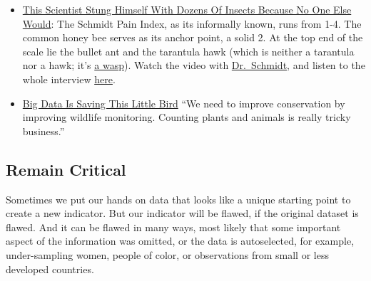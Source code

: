 \documentclass[
  a4paper,
  openany, a4paper, oneside]{book}
\providecommand{\tightlist}{%
  \setlength{\itemsep}{0pt}\setlength{\parskip}{0pt}}
\begin{document}
\begin{itemize}
\tightlist
\item
  \href{https://fivethirtyeight.com/features/this-scientist-stung-himself-with-dozens-of-insects-because-no-one-else-would/}{This Scientist Stung Himself With Dozens Of Insects Because No One Else Would}: The Schmidt Pain Index, as its informally known, runs from 1-4. The common honey bee serves as its anchor point, a solid 2. At the top end of the scale lie the bullet ant and the tarantula hawk (which is neither a tarantula nor a hawk; it's \href{https://www.wired.com/2015/07/absurd-creature-of-the-week-tarantula-hawk/}{a wasp}). Watch the video with \href{https://youtu.be/i0LjT-qkUes}{Dr.~Schmidt}, and listen to the whole interview \href{https://podcasts.apple.com/us/podcast/48-the-schmidt-sting-pain-index/id1011406983?i=1000391467968}{here}.
\item
  \href{https://fivethirtyeight.com/features/big-data-is-saving-this-little-bird/}{Big Data Is Saving This Little Bird} ``We need to improve conservation by improving wildlife monitoring. Counting plants and animals is really tricky business.''
\end{itemize}

\hypertarget{critical-attitude}{%
\subsection{Remain Critical}\label{critical-attitude}}

Sometimes we put our hands on data that looks like a unique starting point to create a new indicator. But our indicator will be flawed, if the original dataset is flawed. And it can be flawed in many ways, most likely that some important aspect of the information was omitted, or the data is autoselected, for example, under-sampling women, people of color, or observations from small or less developed countries.
\end{document}

